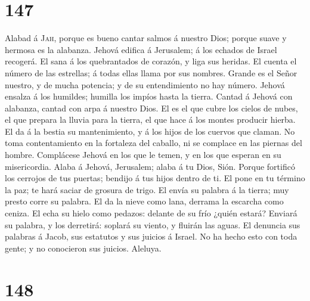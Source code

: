 \hypertarget{section-146}{%
\section{147}\label{section-146}}

 Alabad á \textsc{Jah}, porque es bueno cantar salmos á
nuestro Dios; porque suave y hermosa es la alabanza. 
Jehová edifica á Jerusalem; á los echados de Israel recogerá.
 El sana á los quebrantados de corazón, y liga sus
heridas.  El cuenta el número de las estrellas; á todas
ellas llama por sus nombres.  Grande es el Señor nuestro,
y de mucha potencia; y de su entendimiento no hay número. 
Jehová ensalza á los humildes; humilla los impíos hasta la tierra.
 Cantad á Jehová con alabanza, cantad con arpa á nuestro
Dios.  El es el que cubre los cielos de nubes, el que
prepara la lluvia para la tierra, el que hace á los montes producir
hierba.  El da á la bestia su mantenimiento, y á los hijos
de los cuervos que claman.  No toma contentamiento en la
fortaleza del caballo, ni se complace en las piernas del hombre.
 Complácese Jehová en los que le temen, y en los que
esperan en su misericordia.  Alaba á Jehová, Jerusalem;
alaba á tu Dios, Sión.  Porque fortificó los cerrojos de
tus puertas; bendijo á tus hijos dentro de ti.  El pone
en tu término la paz; te hará saciar de grosura de trigo.
 El envía su palabra á la tierra; muy presto corre su
palabra.  El da la nieve como lana, derrama la escarcha
como ceniza.  El echa su hielo como pedazos: delante de
su frío ¿quién estará?  Enviará su palabra, y los
derretirá: soplará su viento, y fluirán las aguas.  El
denuncia sus palabras á Jacob, sus estatutos y sus juicios á Israel.
 No ha hecho esto con toda gente; y no conocieron sus
juicios. Aleluya.

\hypertarget{section-147}{%
\section{148}\label{section-147}}


